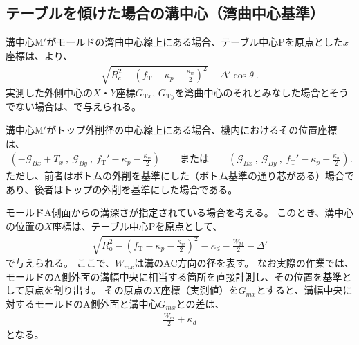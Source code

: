 \subsection{テーブルを傾けた場合の溝中心（湾曲中心基準）}
溝中心M$'$がモールドの湾曲中心線上にある場合、テーブル中心Pを原点とした$x$座標は、より、
\begin{align*}
  \sqrt{R_\mathrm c^2-\left(f_\mathrm T-\kappa_p-\frac{\kappa_w}2\right)^{\!2}}
  -\varDelta'\cos\theta\ .
\end{align*}
実測した外側中心の$X$・$Y$座標$G_{\mathrm Tx}$, $G_{\mathrm Ty}$を湾曲中心のそれとみなした場合とそうでない場合は、で与えられる。




\clearpage
溝中心M$'$がトップ外削径の中心線上にある場合、機内におけるその位置座標は、
\begin{align*}
  \left(
    -\mathcal G_{Bx}+T_x\ ,\
    \mathcal G_{By}\ ,\
    f_\mathrm T'-\kappa_p-\frac{\kappa_w}2
  \right) \qquad
  \text{または}\qquad
  \left(
    \mathcal G_{Bx}\ ,\
    \mathcal G_{By}\ ,\
    f_\mathrm T'-\kappa_p-\frac{\kappa_w}2
  \right).
\end{align*}
ただし、前者はボトムの外削を基準にした（ボトム基準の通り芯がある）場合であり、後者はトップの外削を基準にした場合である。




モールドA側面からの溝深さが指定されている場合を考える。
このとき、溝中心の位置の$X$座標は、テーブル中心Pを原点として、
\begin{align*}
  \sqrt{R_\mathrm o^2-\left(f_\mathrm T-\kappa_p-\frac{\kappa_w}2\right)^{\!2}}-\kappa_d-\frac{W_\mathrm M}2
  -\varDelta'
\end{align*}
で与えられる。
ここで、$W_{mx}$は溝のAC方向の径を表す。
なお実際の作業では、モールドのA側外面の溝幅中央に相当する箇所を直接計測し、その位置を基準として原点を割り出す。
その原点の$X$座標（実測値）を$G_{mx}$とすると、溝幅中央に対するモールドのA側外面と溝中心$G_{mx}$との差は、
\begin{align*}
  \frac{W_m}2+\kappa_d
\end{align*}
となる。




